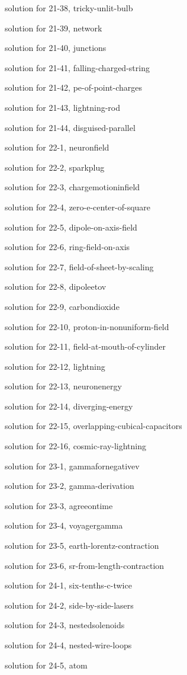 \documentclass{problems}
\begin{document}
solution for 21-38, tricky-unlit-bulb

solution for 21-39, network

solution for 21-40, junctions

solution for 21-41, falling-charged-string

solution for 21-42, pe-of-point-charges

solution for 21-43, lightning-rod

solution for 21-44, disguised-parallel

solution for 22-1, neuronfield

solution for 22-2, sparkplug

solution for 22-3, chargemotioninfield

solution for 22-4, zero-e-center-of-square

solution for 22-5, dipole-on-axis-field

solution for 22-6, ring-field-on-axis

solution for 22-7, field-of-sheet-by-scaling

solution for 22-8, dipoleetov

solution for 22-9, carbondioxide

solution for 22-10, proton-in-nonuniform-field

solution for 22-11, field-at-mouth-of-cylinder

solution for 22-12, lightning

solution for 22-13, neuronenergy

solution for 22-14, diverging-energy

solution for 22-15, overlapping-cubical-capacitors

solution for 22-16, cosmic-ray-lightning

solution for 23-1, gammafornegativev

solution for 23-2, gamma-derivation

solution for 23-3, agreeontime

solution for 23-4, voyagergamma

solution for 23-5, earth-lorentz-contraction

solution for 23-6, sr-from-length-contraction

solution for 24-1, six-tenths-c-twice

solution for 24-2, side-by-side-lasers

solution for 24-3, nestedsolenoids

solution for 24-4, nested-wire-loops

solution for 24-5, atom
\end{document}
